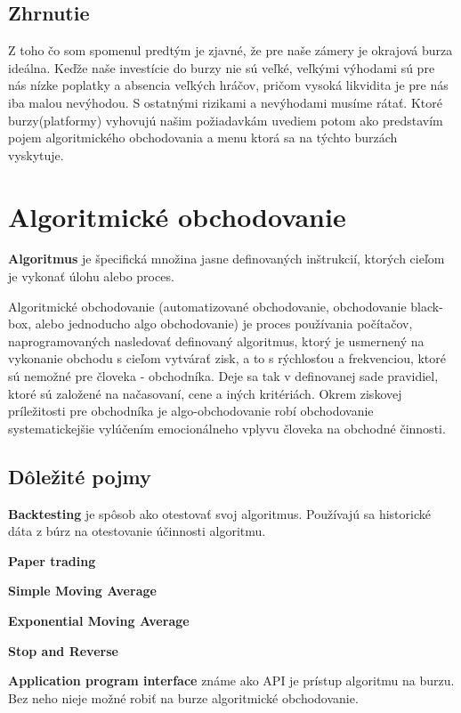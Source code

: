 \subsection{Zhrnutie} 
Z toho čo som spomenul predtým je zjavné,  že pre naše zámery je okrajová burza ideálna. Keďže naše investície do burzy nie sú veľké, veľkými výhodami sú pre nás nízke poplatky a absencia veľkých hráčov, pričom vysoká likvidita je pre nás iba malou nevýhodou. S ostatnými rizikami a nevýhodami musíme rátať. Ktoré burzy(platformy) vyhovujú našim požiadavkám uvediem potom ako predstavím pojem algoritmického obchodovania a menu ktorá sa na týchto burzách vyskytuje. 
\section{Algoritmické obchodovanie} 
\begin{mydef} 
{\bf Algoritmus} je špecifická množina jasne definovaných inštrukcií, ktorých cieľom je vykonať úlohu alebo proces. 
\end{mydef} 
Algoritmické obchodovanie (automatizované obchodovanie, obchodovanie black-box, alebo jednoducho algo obchodovanie) je proces používania počítačov, naprogramovaných nasledovať definovaný algoritmus, ktorý je usmernený na vykonanie obchodu s cieľom vytvárať zisk, a to s  rýchlosťou a frekvenciou, ktoré sú nemožné pre človeka - obchodníka. Deje sa tak v definovanej sade pravidiel, ktoré sú založené na načasovaní, cene a iných kritériách. Okrem ziskovej príležitosti pre obchodníka je algo-obchodovanie %
robí obchodovanie systematickejšie vylúčením emocionálneho vplyvu človeka na obchodné činnosti.\cite{Ba} 
\subsection{Dôležité pojmy} 
\begin{mydef} 
{\bf Backtesting}  je spôsob ako otestovať svoj algoritmus. Používajú sa historické dáta z búrz na otestovanie účinnosti algoritmu. 
\end{mydef} 
\begin{mydef} 
{\bf Paper trading}  
\end{mydef} 
\begin{mydef} 
{\bf Simple Moving Average}  
\end{mydef} 
\begin{mydef} 
{\bf Exponential Moving Average}  
\end{mydef} 
\begin{mydef} 
{\bf Stop and Reverse}  
\end{mydef} 
\begin{mydef} 
{\bf Application program interface} známe ako API je prístup algoritmu na burzu. Bez neho nieje možné robiť na burze algoritmické obchodovanie.  
\end{mydef} 

